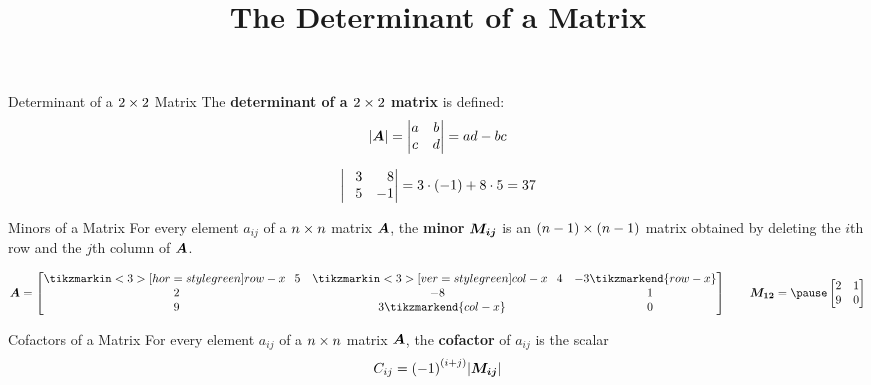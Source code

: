 \documentclass{beamer}
\title[MATH 2250 - Section 3.4]{The Determinant of a Matrix}
\begin{document}
\begin{frame}
  \titlepage
\end{frame}

\begin{frame}
\begin{block}{Determinant of a $2 \times 2$ Matrix}
The \textbf{determinant of a $2 \times 2$ matrix} is defined:
\begin{equation*}
{\left\lvert \boldsymbol{A}\right\rvert} = 
\begin{vmatrix}
a & b \\
c & d
\end{vmatrix}
=ad-bc
\end{equation*}
\end{block}\pause
\begin{example}
\begin{equation*}
\begin{vmatrix}
\+3 & \+8\\
\+5 & -1
\end{vmatrix}
=3\cdot (-1) + 8\cdot 5=37
\end{equation*}
\end{example}
\end{frame}

\begin{frame}
\begin{block}{Minors of a Matrix}
For every element $a_{ij}$ of a $n \times n$ matrix $\boldsymbol{A}$, the \textbf{minor} $\boldsymbol{M_{ij}}$ is an $(n-1) \times (n-1)$ matrix obtained by deleting the $i$th row and the $j$th column of $\boldsymbol{A}$.
\end{block}\pause
\begin{example}
\begin{equation*}
\mat{A}=
\begin{bmatrix}
	\tikzmarkin<3>[hor=style green]{row-x}\+5 & \tikzmarkin<3>[ver=style green]{col-x}\+4 &  -3\tikzmarkend{row-x}\\
	\+2 &  -8 & \+1\\
	\+9 & \+3\tikzmarkend{col-x} & \+0\\
\end{bmatrix}
\qquad
\mat{M_{12}}=\pause
\begin{bmatrix}
		2 & 1\\
		9 & 0\\
\end{bmatrix}
\end{equation*}
\end{example}\pause
\begin{block}{Cofactors of a Matrix}
For every element $a_{ij}$ of a $n \times n$ matrix $\boldsymbol{A}$, the \textbf{cofactor} of $a_{ij}$ is the scalar
\begin{equation*}
C_{ij}={(-1)}^{(i+j)}{\left\lvert \boldsymbol{M_{ij}}\right\rvert}
\end{equation*}
\end{block}
\end{frame}
\end{document}
